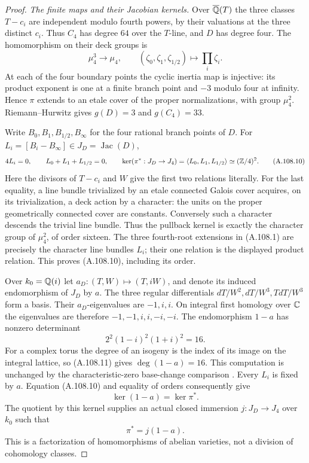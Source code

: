 \begin{proof}
\emph{The finite maps and their Jacobian kernels.}
Over $\overline{\mathbb Q}(T)$ the three classes $T-c_i$
are independent modulo fourth powers, by their
valuations at the three distinct $c_i$.
Thus $C_4$ has degree $64$ over the $T$-line, and
$D$ has degree four.
The homomorphism on their deck groups is
\[
       \mu_4^3\longrightarrow\mu_4,\qquad
                    (\zeta_0,\zeta_1,\zeta_{1/2})
                         \longmapsto\prod_i\zeta_i.
\tag{A.108.9}
\]
At each of the four boundary points the cyclic
inertia map is injective: its product exponent is
one at a finite branch point and $-3$ modulo four
at infinity.  Hence $\pi$ extends to an etale cover
of the proper normalizations, with group $\mu_4^2$.
Riemann--Hurwitz gives $g(D)=3$ and $g(C_4)=33$.

Write $B_0,B_1,B_{1/2},B_\infty$ for the four
rational branch points of $D$.
For $L_i=[B_i-B_\infty]\in J_D=\operatorname{Jac}(D)$,
\[
 4L_i=0,\qquad L_0+L_1+L_{1/2}=0,\qquad
 \ker(\pi^*:J_D\to J_4)
       =\langle L_0,L_1,L_{1/2}\rangle
                          \simeq(\mathbb Z/4)^2.
\tag{A.108.10}
\]
Here the divisors of $T-c_i$ and $W$ give the first
two relations literally.
For the last equality, a line bundle trivialized
by an etale connected Galois cover acquires, on
its trivialization, a deck action by a character:
the units on the proper geometrically connected
cover are constants.
Conversely such a character descends the trivial
line bundle.  Thus the pullback kernel is exactly
the character group of $\mu_4^2$, of order sixteen.
The three fourth-root extensions in (A.108.1)
are precisely the character line bundles $L_i$;
their one relation is the displayed product relation.
This proves (A.108.10), including its order.

Over $k_0=\mathbb Q(i)$ let
$a_D:(T,W)\mapsto(T,iW)$, and denote its induced
endomorphism of $J_D$ by $a$.
The three regular differentials
$dT/W^2,dT/W^3,TdT/W^3$ form a basis.
Their $a_D$-eigenvalues are $-1,i,i$.
On integral first homology over $\mathbb C$ the eigenvalues
are therefore $-1,-1,i,i,-i,-i$.
The endomorphism $1-a$ has nonzero determinant
\[
             2^2(1-i)^2(1+i)^2=16.
\tag{A.108.11}
\]
For a complex torus the degree of an isogeny is
the index of its image on the integral lattice,
so (A.108.11) gives $\deg(1-a)=16$.
This computation is unchanged by the characteristic-zero
base-change comparison
\cite[Remark 3.3(c), Theorems 21.3 and 21.5]{AgentMilneLEC}.
Every $L_i$ is fixed by $a$.
Equation (A.108.10) and equality of orders consequently give
\[
                    \ker(1-a)=\ker\pi^*.
\tag{A.108.12}
\]
The quotient by this kernel supplies an actual
closed immersion $j:J_D\to J_4$ over $k_0$ such that
\[
                  \pi^*=j(1-a).
\tag{A.108.13}
\]
This is a factorization of homomorphisms of
abelian varieties, not a division of cohomology classes.


\end{proof}
